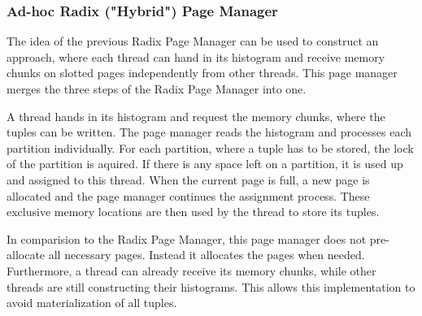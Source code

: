 \subsubsection{Ad-hoc Radix ("Hybrid") Page Manager} \label{subsubsection-Ad-hoc-Radix-Page-Manager}
The idea of the previous Radix Page Manager can be used to construct an approach, where each thread can hand in its histogram and receive memory chunks on slotted pages independently from other threads.
This page manager merges the three steps of the Radix Page Manager into one.

A thread hands in its histogram and request the memory chunks, where the tuples can be written.
The page manager reads the histogram and processes each partition individually.
For each partition, where a tuple has to be stored, the lock of the partition is aquired.
If there is any space left on a partition, it is used up and assigned to this thread.
When the current page is full, a new page is allocated and the page manager continues the assignment process.
These exclusive memory locations are then used by the thread to store its tuples.

In comparision to the Radix Page Manager, this page manager does not pre-allocate all necessary pages.
Instead it allocates the pages when needed.
Furthermore, a thread can already receive its memory chunks, while other threads are still constructing their histograms.
This allows this implementation to avoid materialization of all tuples.
